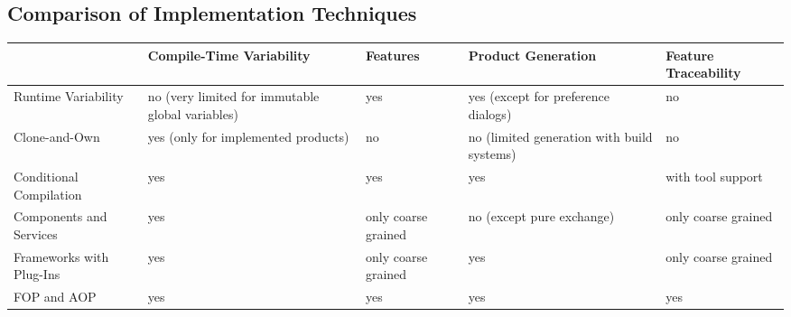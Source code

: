 \subsection{Comparison of Implementation Techniques}
\begin{frame}
	\centering
	\begin{tabular}{|p{30mm}|p{20mm}|p{20mm}|p{20mm}|p{20mm}|}
		\hline
		 & Compile-Time Variability & Features & Product \mbox{Generation} & Feature \mbox{Traceability} \\
		\hline
		Runtime \mbox{Variability} & no (very limited for immutable global variables) & yes & yes (except for preference dialogs) & no \\
		\hline
		Clone-and-Own & yes (only for implemented products) & no & no (limited generation with build systems) & no \\
		\hline
		Conditional Compilation & yes & yes & yes & with tool support \\
		\hline
		Components and Services & yes & only coarse grained & no (except pure exchange) & only coarse grained \\
		\hline
		Frameworks with Plug-Ins & yes & only coarse grained & yes & only coarse grained \\
		\hline
		FOP and AOP & yes & yes & yes & yes \\
		\hline
	\end{tabular}
\end{frame}


